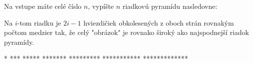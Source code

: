 




Na vstupe máte celé číslo $n$, vypíšte $n$ riadkovú pyramídu nasledovne:

Na $i$-tom riadku je $2i-1$ hviezdičiek obkolesených z oboch strán rovnakým počtom medzier tak,
že celý "obrázok" je rovnako široký ako najspodnejší riadok pyramídy.

\vystup
      *      
     ***     
    *****    
   *******   
  *********  
 *********** 
*************
\koniec


